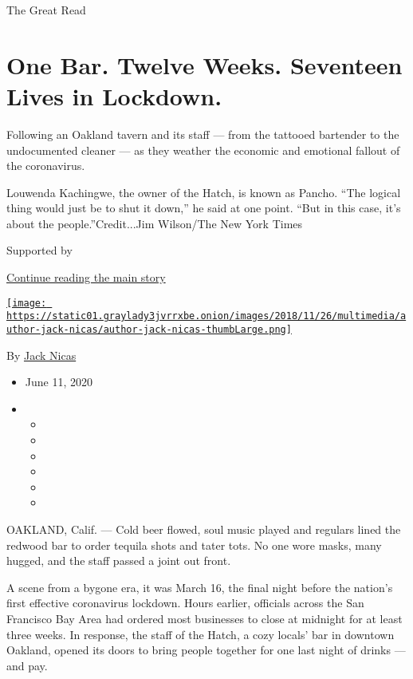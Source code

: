 The Great Read

\hypertarget{one-bar-twelve-weeks-seventeen-lives-in-lockdown}{%
\section{One Bar. Twelve Weeks. Seventeen Lives in
Lockdown.}\label{one-bar-twelve-weeks-seventeen-lives-in-lockdown}}

Following an Oakland tavern and its staff --- from the tattooed
bartender to the undocumented cleaner --- as they weather the economic
and emotional fallout of the coronavirus.

Louwenda Kachingwe, the owner of the Hatch, is known as Pancho. ``The
logical thing would just be to shut it down,'' he said at one point.
``But in this case, it's about the people.''Credit...Jim Wilson/The New
York Times

Supported by

\protect\hyperlink{after-sponsor}{Continue reading the main story}

\href{https://www.nytimes3xbfgragh.onion/by/jack-nicas}{\texttt{[image: https://static01.graylady3jvrrxbe.onion/images/2018/11/26/multimedia/author-jack-nicas/author-jack-nicas-thumbLarge.png]}}

By \href{https://www.nytimes3xbfgragh.onion/by/jack-nicas}{Jack Nicas}

\begin{itemize}
\item
  June 11, 2020
\item
  \begin{itemize}
  \item
  \item
  \item
  \item
  \item
  \item
  \end{itemize}
\end{itemize}

OAKLAND, Calif. --- Cold beer flowed, soul music played and regulars
lined the redwood bar to order tequila shots and tater tots. No one wore
masks, many hugged, and the staff passed a joint out front.

A scene from a bygone era, it was March 16, the final night before the
nation's first effective coronavirus lockdown. Hours earlier, officials
across the San Francisco Bay Area had ordered most businesses to close
at midnight for at least three weeks. In response, the staff of the
Hatch, a cozy locals' bar in downtown Oakland, opened its doors to bring
people together for one last night of drinks --- and pay.


